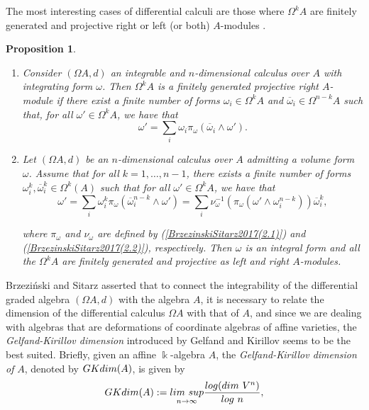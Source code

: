 \documentclass{amsart}
\newtheorem{proposition}[theorem]{Proposition}
\theoremstyle{definition}
\theoremstyle{remark}
\numberwithin{equation}{section}
\begin{document}
The most interesting cases of differential calculi are those where $\Omega^k A$ are finitely generated and projective right or left (or both) $A$-modules \cite{Brzezinski2011}.

\begin{proposition}\label{BrzezinskiSitarz2017Lemmas2.6and2.7}
\begin{enumerate}
\item [\rm (1)] \cite[Lemma 2.6]{BrzezinskiSitarz2017} Consider $(\Omega A, d)$ an integrable and $n$-dimensional calculus over $A$ with integrating form $\omega$. Then $\Omega^{k} A$ is a finitely generated projective right $A$-module if there exist a finite number of forms $\omega_i \in \Omega^{k} A$ and $\overline{\omega}_i \in \Omega^{n-k} A$ such that, for all $\omega' \in \Omega^{k} A$, we have that 
\begin{equation*}
\omega' = \sum_{i} \omega_i \pi_{\omega} (\overline{\omega}_i \wedge \omega').
\end{equation*}

\item [\rm (2)] \cite[Lemma 2.7]{BrzezinskiSitarz2017} Let $(\Omega A, d)$ be an $n$-dimensional calculus over $A$ admitting a volume form $\omega$. Assume that for all $k = 1, \ldots, n-1$, there exists a finite number of forms $\omega_{i}^{k},\overline{\omega}_{i}^{k} \in \Omega^{k}(A)$ such that for all $\omega'\in \Omega^kA$, we have that
\begin{equation*}
\omega'=\displaystyle\sum_i\omega_{i}^{k}\pi_\omega(\overline{\omega}_{i}^{n-k}\wedge\omega')=\displaystyle\sum_i\nu_{\omega}^{-1}(\pi_\omega(\omega'\wedge\omega_{i}^{n-k}))\overline{\omega}_{i}^{k},
\end{equation*}

where $\pi_{\omega}$ and $\nu_{\omega}$ are defined by {\rm (}\ref{BrzezinskiSitarz2017(2.1)}{\rm )} and {\rm (}\ref{BrzezinskiSitarz2017(2.2)}{\rm )}, respectively. Then $\omega$ is an integral form and all the $\Omega^{k}A$ are finitely generated and projective as left and right $A$-modules.
\end{enumerate}
\end{proposition}

Brzezi\'nski and Sitarz \cite[p. 421]{BrzezinskiSitarz2017} asserted that to connect the integrability of the differential graded algebra $(\Omega A, d)$ with the algebra $A$, it is necessary to relate the dimension of the differential calculus $\Omega A$ with that of $A$, and since we are dealing with algebras that are deformations of coordinate algebras of affine varieties, the {\em Gelfand-Kirillov dimension} introduced by Gelfand and Kirillov \cite{GelfandKirillov1966, GelfandKirillov1966b} seems to be the best suited. Briefly, given an affine $\Bbbk$-algebra $A$, the {\em Gelfand-Kirillov dimension of} $A$, denoted by ${\rm GKdim}(A)$, is given by
\[
{\rm GKdim}(A) := \underset{n\to \infty}{\rm lim\ sup} \frac{{\rm log}({\rm dim}\ V^{n})}{{\rm log}\ n},
\]
\end{document}
